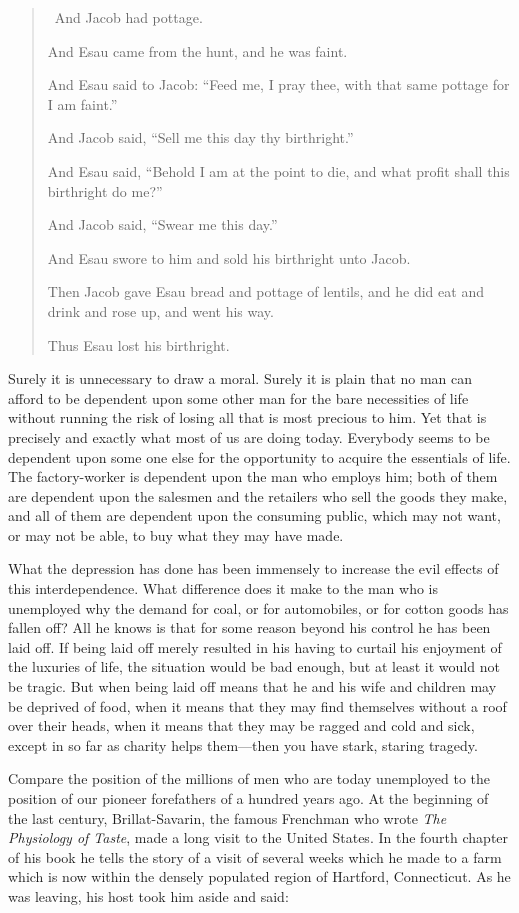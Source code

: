 \documentclass{book}
\begin{document}
\begin{quotation}\
	And Jacob had pottage.

	And Esau came from the hunt, and he was faint.

	And Esau said to Jacob: “Feed me, I pray thee, with that same pottage for I am faint.”

	And Jacob said, “Sell me this day thy birthright.”

	And Esau said, “Behold I am at the point to die, and what profit shall this birthright do me?”

	And Jacob said, “Swear me this day.”

	And Esau swore to him and sold his birthright unto Jacob.

	Then Jacob gave Esau bread and pottage of lentils, and he did eat and drink and rose up, and went his way.

	Thus Esau lost his birthright.
\end{quotation}

Surely it is unnecessary to draw a moral. Surely it is plain that no man can afford to be dependent upon some other man for the bare necessities of life without running the risk of losing all that is most precious to him. Yet that is precisely and exactly what most of us are doing today. Everybody seems to be dependent upon some one else for the opportunity to acquire the essentials of life. The factory-worker is dependent upon the man who employs him; both of them are dependent upon the salesmen and the retailers who sell the goods they make, and all of them are dependent upon the consuming public, which may not want, or may not be able, to buy what they may have made.

What the depression has done has been immensely to increase the evil effects of this interdependence. What difference does it make to the man who is unemployed why the demand for coal, or for automobiles, or for cotton goods has fallen off? All he knows is that for some reason beyond his control he has been laid off. If being laid off merely resulted in his having to curtail his enjoyment of the luxuries of life, the situation would be bad enough, but at least it would not be tragic. But when being laid off means that he and his wife and children may be deprived of food, when it means that they may find themselves without a roof over their heads, when it means that they may be ragged and cold and sick, except in so far as charity helps them—then you have stark, staring tragedy.

Compare the position of the millions of men who are today unemployed to the position of our pioneer forefathers of a hundred years ago. At the beginning of the last century, Brillat-Savarin, the famous Frenchman who wrote \emph{The Physiology of Taste}, made a long visit to the United States. In the fourth chapter of his book he tells the story of a visit of several weeks which he made to a farm which is now within the densely populated region of Hartford, Connecticut. As he was leaving, his host took him aside and said:
\end{document}
